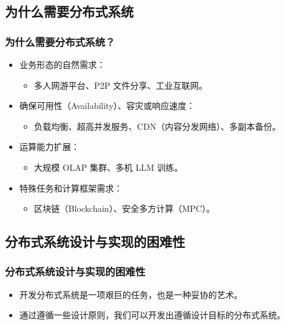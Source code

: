\subsection{为什么需要分布式系统}

\subsubsection*{为什么需要分布式系统？}

\begin{itemize}
  \item 业务形态的自然需求：
  \begin{itemize}
    \item 多人网游平台、P2P 文件分享、工业互联网。
  \end{itemize}
  \item 确保可用性（Availability）、容灾或响应速度：
  \begin{itemize}
    \item 负载均衡、超高并发服务、CDN（内容分发网络）、多副本备份。
  \end{itemize}
  \item 运算能力扩展：
  \begin{itemize}
    \item 大规模 OLAP 集群、多机 LLM 训练。
  \end{itemize}
  \item 特殊任务和计算框架需求：
  \begin{itemize}
    \item 区块链（Blockchain）、安全多方计算（MPC）。
  \end{itemize}
\end{itemize}

\subsection{分布式系统设计与实现的困难性}

\subsubsection*{分布式系统设计与实现的困难性}

\begin{itemize}
  \item 开发分布式系统是一项艰巨的任务，也是一种妥协的艺术。
  \item 通过遵循一些设计原则，我们可以开发出遵循设计目标的分布式系统。
\end{itemize}

